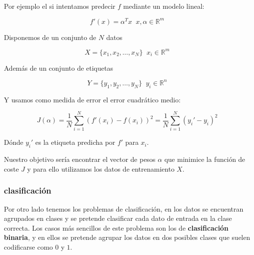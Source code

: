             \medskip 

            \noindent Por ejemplo el si intentamos predecir $f$ mediante un modelo lineal: 

            \begin{equation}
                f'(x)= \alpha^T x \; \; x,\alpha \in \mathbb{R}^m
            \end{equation}

            \noindent Disponemos de un conjunto de $N$ datos 
            
            \begin{equation}
                X= \lbrace x_1, x_2 , \ldots , x_N \rbrace \; \; x_i \in \mathbb{R}^m
            \end{equation}

            \noindent Además de un conjunto de etiquetas

            \begin{equation}
                Y= \lbrace y_1, y_2 , \ldots , y_N \rbrace \; \; y_i \in \mathbb{R}^n
            \end{equation}

            \noindent Y usamos como medida de error el error cuadrático medio: 

            \begin{equation}
               J(\alpha)= \frac{1}{N} \sum_{i=1}^{N}(f'(x_i) - f(x_i))^2 = \frac{1}{N} \sum_{i=1}^{N}(y_i' - y_i)^2
            \end{equation}

            \noindent Dónde $y_i'$ es la etiqueta predicha por $f'$ para $x_i$.

            \medskip

            \noindent Nuestro objetivo sería encontrar el vector de pesos $\alpha$ que minimice la función de coste $J$ y para ello utilizamos los datos de entrenamiento $X$.
            
        \subsubsection{clasificación}
            \noindent Por otro lado tenemos los problemas de clasificación, en los datos se encuentran agrupados en clases y se pretende clasificar cada dato de entrada en la clase correcta. Los casos más sencillos de este problema son los de \textbf{clasificación binaria}, y en ellos se pretende agrupar los datos en dos posibles clases que suelen codificarse como $0$ y $1$.

